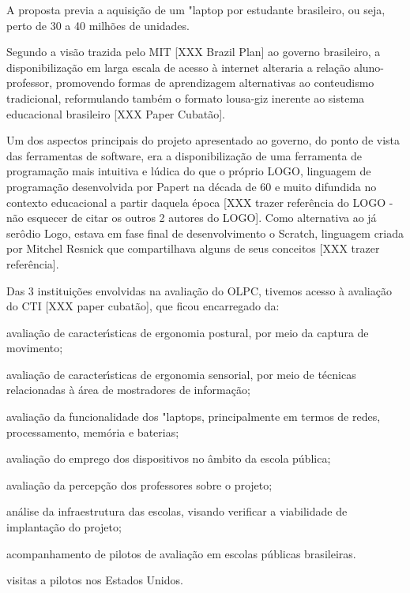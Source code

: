 \documentclass[
12pt,		%
openright,	%
twoside,  %
a4paper,			%
chapter=TITLE,		%
english,			%
french,				%
spanish,			%
brazil				%
]{USPSC-classe/USPSC}
\begin{document}
A proposta previa a aquisi\c{c}\~ao de um "laptop por estudante brasileiro, ou seja, perto de 30 a 40 milh\~oes de unidades.


Segundo a vis\~ao trazida pelo MIT [XXX Brazil Plan] ao governo brasileiro, a disponibiliza\c{c}\~ao em larga escala de acesso \`a internet alteraria a rela\c{c}\~ao aluno-professor, promovendo formas de aprendizagem alternativas ao conteudismo tradicional, reformulando tamb\'em o formato lousa-giz inerente ao sistema educacional brasileiro [XXX Paper Cubat\~ao].


Um dos aspectos principais do projeto apresentado ao governo, do ponto de vista das ferramentas de software, era a disponibiliza\c{c}\~ao de uma ferramenta de programa\c{c}\~ao mais intuitiva e l\'udica do que o pr\'oprio LOGO, linguagem de programa\c{c}\~ao desenvolvida por Papert na d\'ecada de 60 e muito difundida no contexto educacional a partir daquela \'epoca [XXX trazer refer\^encia do LOGO - n\~ao esquecer de citar os outros 2 autores do LOGO]. Como alternativa ao j\'a ser\^odio Logo, estava em fase final de desenvolvimento o Scratch, linguagem criada por Mitchel Resnick que compartilhava alguns de seus conceitos [XXX trazer refer\^encia].


Das 3 institui\c{c}\~oes envolvidas na avalia\c{c}\~ao do OLPC, tivemos acesso \`a avalia\c{c}\~ao do CTI [XXX paper cubat\~ao], que ficou encarregado da:



\begin{alineas}
\item avalia\c{c}\~ao de caracter\'{\i}sticas de ergonomia postural, por meio da captura de movimento;
\item avalia\c{c}\~ao de caracter\'{\i}sticas de ergonomia sensorial, por meio de t\'ecnicas relacionadas \`a \'area de mostradores de informa\c{c}\~ao;
\item avalia\c{c}\~ao da funcionalidade dos "laptops, principalmente em termos de redes, processamento, mem\'oria e baterias;
\item avalia\c{c}\~ao do emprego dos dispositivos no \^ambito da escola p\'ublica;
\item avalia\c{c}\~ao da percep\c{c}\~ao dos professores sobre o projeto;
\item an\'alise da infraestrutura das escolas, visando verificar a viabilidade de implanta\c{c}\~ao do projeto;
\item acompanhamento de pilotos de avalia\c{c}\~ao em escolas p\'ublicas brasileiras.
\item visitas a pilotos nos Estados Unidos.
\end{alineas}
\end{document}
